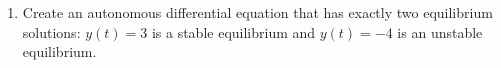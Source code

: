 \clearpage


\begin{enumerate}[resume]





\item Create an autonomous differential equation that has exactly two equilibrium solutions: $y(t)=3$ is a stable equilibrium and $y(t) = -4$ is an unstable equilibrium.

\end{enumerate}
\clearpage


